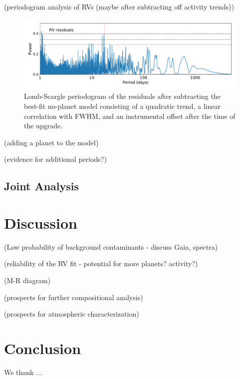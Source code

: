 \documentclass[modern]{aastex62}
\begin{document}
(periodogram analysis of RVs (maybe after subtracting off activity trends))

\begin{figure}
    \centering
    \includegraphics[width=\textwidth]{periodogram_resids1.pdf}
    \caption{Lomb-Scargle periodogram of the \RV residuals after subtracting the best-fit no-planet model consisting of a quadratic trend, a linear correlation with FWHM, and an instrumental offset after the time of the \HARPS upgrade.}
    \label{fig:periodogram_resids1}
\end{figure}

(adding a planet to the model)

(evidence for additional periods?)

\subsection{Joint Analysis}
\label{s:analysis:joint}


\section{Discussion}
\label{s:discussion}


(Low probability of background contaminants - discuss Gaia, spectra)

(reliability of the RV fit - potential for more planets? activity?)

(M-R diagram)

(prospects for further compositional analysis)

(prospects for atmospheric characterization)

\section{Conclusion}
\label{s:conclusion}


\acknowledgements
We thank ...





\end{document}

